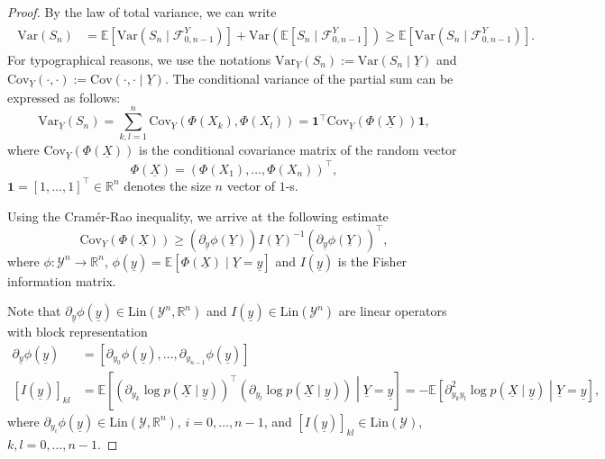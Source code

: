 \documentclass[a4paper,10pt]{article}
\newcommand{\R}{\mathbb{R}}
\newcommand{\F}{\mathcal{F}}
\newcommand{\Y}{\mathcal{Y}}
\newcommand{\E}{\mathbb{E}}
\newcommand{\cov}{\mathrm{Cov}}
\newcommand{\var}{\mathrm{Var}}
\newcommand{\lin}{\mathrm{Lin}}
\newcommand{\ul}[1]{\underline{#1}}
\begin{document}
\begin{proof}
	By the law of total variance, we can write
	\begin{align}\label{eq:totvar}
	\begin{split}
	\var (S_n) &= \E \left[\var (S_n \mid \F_{0,n-1}^Y)\right] + 
	\var\left(\E \left[S_n\mid\F_{0,n-1}^Y \right]\right)
	\ge \E \left[\var (S_n \mid\F_{0,n-1}^Y)\right].
	\end{split}
	\end{align}
	For typographical reasons, we use the notations $\var_{\ul{Y}}(S_n):=\text{Var} (S_n \mid \ul{Y})$ and $\cov_{\ul{Y}}(\cdot,\cdot):=\cov(\cdot,\cdot\mid\ul{Y})$. 
	The conditional variance of the partial sum can be expressed as follows:
	\begin{equation}\label{eq:varbound}
	\var_{\ul{Y}}(S_n)=\sum_{k,l=1}^{n}\cov_{\ul{Y}} (\Phi (X_k),\Phi (X_l)) = \mathbf{1}^\top\cov_{\ul{Y}} (\Phi (\ul{X}))\mathbf{1},
	\end{equation}
	where $\cov_{\ul{Y}} (\Phi (\ul{X}))$ is the conditional covariance matrix of the random vector 
	$$
	\Phi(\ul{X})=(\Phi (X_1),\ldots,\Phi (X_n))^\top,
	$$ 
	$\mathbf{1} = [1,\ldots,1]^\top\in\R^n$ denotes the size $n$ vector of $1$-s.
		
	Using the Cram\'er-Rao inequality, we arrive at the following estimate
	\begin{equation}\label{eq:CR}
	\cov_{\ul{Y}} (\Phi (\ul{X}))\ge (\partial_{\ul{y}}\phi (\ul{Y}))I(\ul{Y})^{-1}(\partial_{\ul{y}}\phi (\ul{Y}))^\top,
	\end{equation}
	where $\phi:\Y^n\to\R^n$, $\phi(\ul{y})=\E\left[\Phi (\ul{X})\mid \ul{Y}=\ul{y}\right]$ and $I(\ul{y})$ is the Fisher information matrix. 
	
	\smallskip
	Note that $\partial_{\ul{y}}\phi (\ul{y})\in\lin (\Y^n,\R^n)$ and $I(\ul{y})\in\lin (\Y^n)$ are linear operators with block representation
	\begin{align*}
	\partial_{\ul{y}}\phi(\ul{y}) &= \left[\partial_{y_0}\phi(\ul{y}),\ldots,\partial_{y_{n-1}}\phi(\ul{y})\right] \\
	[I(\ul{y})]_{kl} &= \E\left[\left(\partial_{y_k}\log p(\ul{X}\mid\ul{y})\right)^\top\left(\partial_{y_l}\log p(\ul{X}\mid\ul{y})\right)\middle| \ul{Y}=\ul{y}\right] = -\E \left[\partial^2_{y_k y_l}\log p(\ul{X}\mid\ul{y})\middle| \ul{Y}=\ul{y}\right],
	\end{align*}
	where $\partial_{y_i}\phi(\ul{y})\in\lin (\Y,\R^n)$, $i=0,\ldots,n-1$, and $[I(\ul{y})]_{kl}\in\lin (\Y)$, $k,l=0,\ldots,n-1$.
	

\end{proof}
\end{document}
